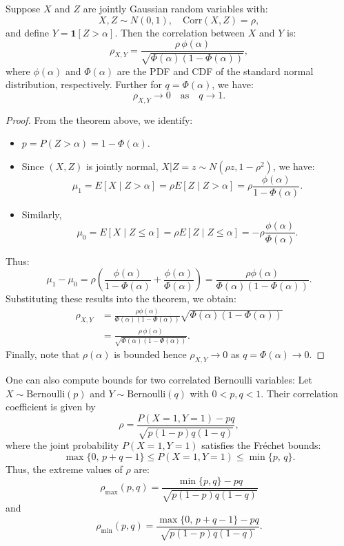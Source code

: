 \begin{corollary}
  Suppose \(X\) and \(Z\) are jointly Gaussian random variables with:
  \[
    X, Z \sim N(0,1), \quad \mathrm{Corr}(X,Z)=\rho,
  \]
  and define \(Y=\mathbf{1}[Z>\alpha]\). Then the correlation between \(X\) and \(Y\) is:
  \[
    \rho_{X,Y} = \frac{\rho\,\phi(\alpha)}{\sqrt{\Phi(\alpha)(1 - \Phi(\alpha))}},
  \]
  where \(\phi(\alpha)\) and \(\Phi(\alpha)\) are the PDF and CDF of the standard normal
  distribution, respectively. Further for \(q = \Phi(\alpha)\), we have: $$ \rho_{X,Y} \to 0
    \quad \text{as} \quad q \to 1. $$
\end{corollary}

\begin{proof}
  From the theorem above, we identify:
  \begin{itemize}
    \item \(p = P(Z>\alpha) = 1-\Phi(\alpha)\).
    \item Since \((X,Z)\) is jointly normal, \(X|Z=z \sim N(\rho z, 1-\rho^2)\), we have:
          \[
            \mu_1 = E[X \mid Z>\alpha] = \rho E[Z \mid Z>\alpha] = \rho \frac{\phi(\alpha)}{1-\Phi(\alpha)}.
          \]
    \item Similarly,
          \[
            \mu_0 = E[X \mid Z \leq \alpha] = \rho E[Z \mid Z\leq\alpha] = -\rho\frac{\phi(\alpha)}{\Phi(\alpha)}.
          \]
  \end{itemize}
  Thus:
  \[
    \mu_1 - \mu_0 = \rho\left(\frac{\phi(\alpha)}{1-\Phi(\alpha)} + \frac{\phi(\alpha)}{\Phi(\alpha)}\right) = \frac{\rho\phi(\alpha)}{\Phi(\alpha)(1-\Phi(\alpha))}.
  \]
  Substituting these results into the theorem, we obtain:
  \begin{align*}
    \rho_{X,Y} & = \frac{\rho\phi(\alpha)}{\Phi(\alpha)(1-\Phi(\alpha))}\sqrt{\Phi(\alpha)(1-\Phi(\alpha))} \\[6pt]
               & = \frac{\rho\,\phi(\alpha)}{\sqrt{\Phi(\alpha)(1 - \Phi(\alpha))}}.
  \end{align*}
  Finally, note that $\rho(\alpha)$ is bounded hence $\rho_{X,Y} \rightarrow 0 $ as $q=\Phi(\alpha) \rightarrow 0$.
\end{proof}

One can also compute bounds for two correlated Bernoulli variables: Let \(X \sim
\mathrm{Bernoulli}(p)\) and \(Y \sim \mathrm{Bernoulli}(q)\) with \(0 < p,q < 1\). Their
correlation coefficient is given by
\[
  \rho = \frac{P(X=1,Y=1)-pq}{\sqrt{p(1-p)q(1-q)}},
\]
where the joint probability \(P(X=1,Y=1)\) satisfies the Fréchet bounds:
\[
  \max\{0,\, p+q-1\} \le P(X=1,Y=1) \le \min\{p,\, q\}.
\]
Thus, the extreme values of \(\rho\) are:
\[
  \rho_{\max}(p,q) = \frac{\min\{p,q\}-pq}{\sqrt{p(1-p)q(1-q)}}
\]
and
\[
  \rho_{\min}(p,q) = \frac{\max\{0,\, p+q-1\}-pq}{\sqrt{p(1-p)q(1-q)}}.
\]

